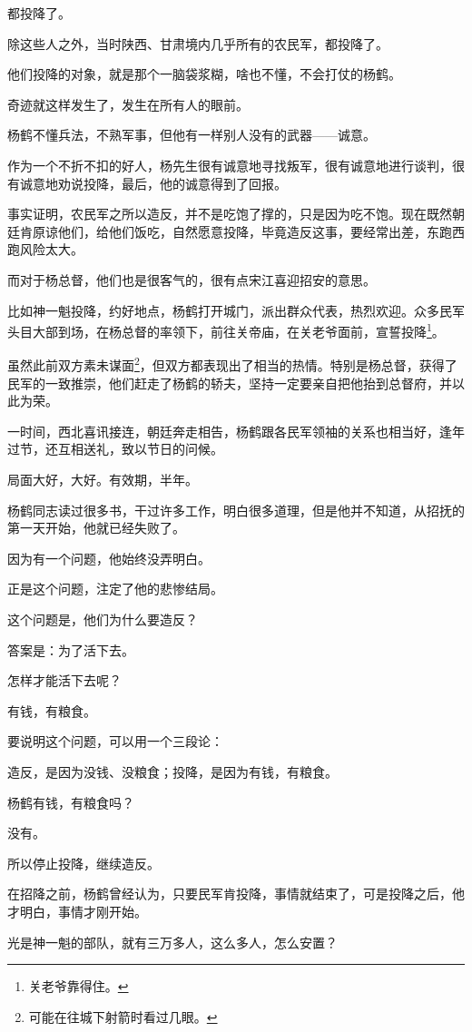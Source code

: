 \begin{multicols}{\theparacolNo}
都投降了。

除这些人之外，当时陕西、甘肃境内几乎所有的农民军，都投降了。

他们投降的对象，就是那个一脑袋浆糊，啥也不懂，不会打仗的杨鹤。

奇迹就这样发生了，发生在所有人的眼前。

杨鹤不懂兵法，不熟军事，但他有一样别人没有的武器——诚意。

作为一个不折不扣的好人，杨先生很有诚意地寻找叛军，很有诚意地进行谈判，很有诚意地劝说投降，最后，他的诚意得到了回报。

事实证明，农民军之所以造反，并不是吃饱了撑的，只是因为吃不饱。现在既然朝廷肯原谅他们，给他们饭吃，自然愿意投降，毕竟造反这事，要经常出差，东跑西跑风险太大。

而对于杨总督，他们也是很客气的，很有点宋江喜迎招安的意思。

比如神一魁投降，约好地点，杨鹤打开城门，派出群众代表，热烈欢迎。众多民军头目大部到场，在杨总督的率领下，前往关帝庙，在关老爷面前，宣誓投降\footnote{关老爷靠得住。}。

虽然此前双方素未谋面\footnote{可能在往城下射箭时看过几眼。}，但双方都表现出了相当的热情。特别是杨总督，获得了民军的一致推崇，他们赶走了杨鹤的轿夫，坚持一定要亲自把他抬到总督府，并以此为荣。

一时间，西北喜讯接连，朝廷奔走相告，杨鹤跟各民军领袖的关系也相当好，逢年过节，还互相送礼，致以节日的问候。

局面大好，大好。有效期，半年。

杨鹤同志读过很多书，干过许多工作，明白很多道理，但是他并不知道，从招抚的第一天开始，他就已经失败了。

因为有一个问题，他始终没弄明白。

正是这个问题，注定了他的悲惨结局。

这个问题是，他们为什么要造反？

答案是：为了活下去。

怎样才能活下去呢？

有钱，有粮食。

要说明这个问题，可以用一个三段论：

造反，是因为没钱、没粮食；投降，是因为有钱，有粮食。

杨鹤有钱，有粮食吗？

没有。

所以停止投降，继续造反。

在招降之前，杨鹤曾经认为，只要民军肯投降，事情就结束了，可是投降之后，他才明白，事情才刚开始。

光是神一魁的部队，就有三万多人，这么多人，怎么安置？


\end{multicols}
